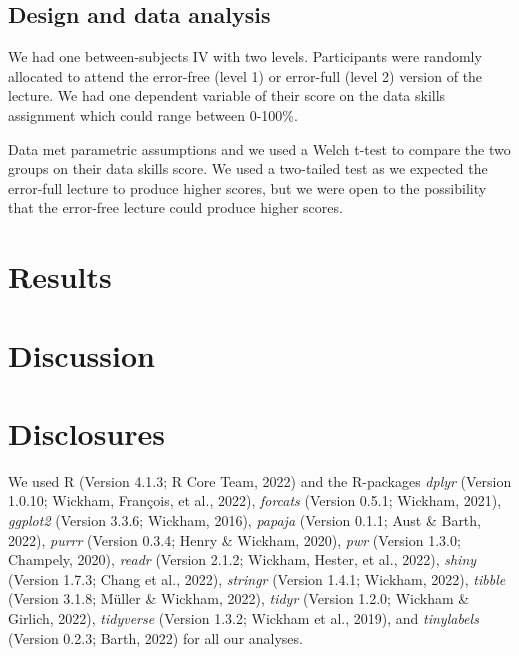 \documentclass[
  man,floatsintext]{apa6}
\begin{document}
\hypertarget{design-and-data-analysis}{%
\subsection{Design and data analysis}\label{design-and-data-analysis}}

We had one between-subjects IV with two levels. Participants were randomly allocated to attend the error-free (level 1) or error-full (level 2) version of the lecture. We had one dependent variable of their score on the data skills assignment which could range between 0-100\%.

Data met parametric assumptions and we used a Welch t-test to compare the two groups on their data skills score. We used a two-tailed test as we expected the error-full lecture to produce higher scores, but we were open to the possibility that the error-free lecture could produce higher scores.

\hypertarget{results}{%
\section{Results}\label{results}}

\hypertarget{discussion}{%
\section{Discussion}\label{discussion}}

\hypertarget{disclosures}{%
\section{Disclosures}\label{disclosures}}

We used R (Version 4.1.3; R Core Team, 2022) and the R-packages \emph{dplyr} (Version 1.0.10; Wickham, François, et al., 2022), \emph{forcats} (Version 0.5.1; Wickham, 2021), \emph{ggplot2} (Version 3.3.6; Wickham, 2016), \emph{papaja} (Version 0.1.1; Aust \& Barth, 2022), \emph{purrr} (Version 0.3.4; Henry \& Wickham, 2020), \emph{pwr} (Version 1.3.0; Champely, 2020), \emph{readr} (Version 2.1.2; Wickham, Hester, et al., 2022), \emph{shiny} (Version 1.7.3; Chang et al., 2022), \emph{stringr} (Version 1.4.1; Wickham, 2022), \emph{tibble} (Version 3.1.8; Müller \& Wickham, 2022), \emph{tidyr} (Version 1.2.0; Wickham \& Girlich, 2022), \emph{tidyverse} (Version 1.3.2; Wickham et al., 2019), and \emph{tinylabels} (Version 0.2.3; Barth, 2022) for all our analyses.

\newpage
\end{document}

